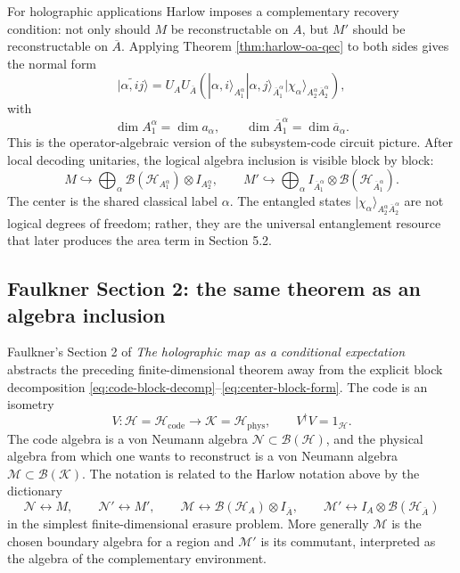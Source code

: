 \documentclass[11pt]{article}
\newcommand{\mH}{\mathcal{H}}
\newcommand{\mB}{\mathcal{B}}
\newcommand{\mM}{\mathcal{M}}
\newcommand{\mN}{\mathcal{N}}
\newcommand{\scrH}{\mathscr{H}}
\newcommand{\scrK}{\mathscr{K}}
\newcommand{\barA}{\overline{A}}
\newcommand{\bara}{\overline{a}}
\newcommand{\ket}[1]{|#1\rangle}
\newcommand{\code}{\mathrm{code}}
\newcommand{\wt}[1]{\widetilde{#1}}
\begin{document}
For holographic applications Harlow imposes a complementary recovery condition:
not only should \(M\) be reconstructable on \(A\), but \(M'\) should be
reconstructable on \(\barA\).  Applying Theorem
\ref{thm:harlow-oa-qec} to both sides gives the normal form
\begin{equation}
    \ket{\wt{\alpha,ij}}
    =
    U_AU_{\barA}
    \left(
    \ket{\alpha,i}_{A_1^\alpha}
    \ket{\alpha,j}_{\barA_1^\alpha}
    \ket{\chi_\alpha}_{A_2^\alpha\barA_2^\alpha}
    \right),
    \label{eq:complementary-normal-form}
\end{equation}
with
\[
    \dim A_1^\alpha=\dim a_\alpha,
    \qquad
    \dim \barA_1^\alpha=\dim \bara_\alpha.
\]
This is the operator-algebraic version of the subsystem-code circuit picture.
After local decoding unitaries, the logical algebra inclusion is visible block
by block:
\[
    M
    \hookrightarrow
    \bigoplus_\alpha
    \mB(\mH_{A_1^\alpha})\otimes I_{A_2^\alpha},
    \qquad
    M'
    \hookrightarrow
    \bigoplus_\alpha
    I_{\barA_1^\alpha}\otimes \mB(\mH_{\barA_1^\alpha}).
\]
The center is the shared classical label \(\alpha\).  The entangled states
\(\ket{\chi_\alpha}_{A_2^\alpha\barA_2^\alpha}\) are not logical degrees of
freedom; rather, they are the universal entanglement resource that later
produces the area term in Section 5.2.

\subsection*{Faulkner Section 2: the same theorem as an algebra inclusion}

Faulkner's Section 2 of \emph{The holographic map as a conditional expectation}
\cite{FaulknerConditional} abstracts the preceding finite-dimensional theorem
away from the explicit block decomposition
\eqref{eq:code-block-decomp}--\eqref{eq:center-block-form}.  The code is an
isometry
\[
    V:\scrH=\scrH_{\code}\longrightarrow \scrK=\scrH_{\mathrm{phys}},
    \qquad
    V^\dagger V=1_{\scrH}.
\]
The code algebra is a von Neumann algebra
\(\mN\subset \mB(\scrH)\), and the physical algebra from which one wants to
reconstruct is a von Neumann algebra \(\mM\subset\mB(\scrK)\).  The notation is
related to the Harlow notation above by the dictionary
\[
    \mN \leftrightarrow M,
    \qquad
    \mN' \leftrightarrow M',
    \qquad
    \mM \leftrightarrow \mB(\mH_A)\otimes I_{\barA},
    \qquad
    \mM' \leftrightarrow I_A\otimes \mB(\mH_{\barA})
\]
in the simplest finite-dimensional erasure problem.  More generally
\(\mM\) is the chosen boundary algebra for a region and \(\mM'\) is its
commutant, interpreted as the algebra of the complementary environment.
\end{document}
